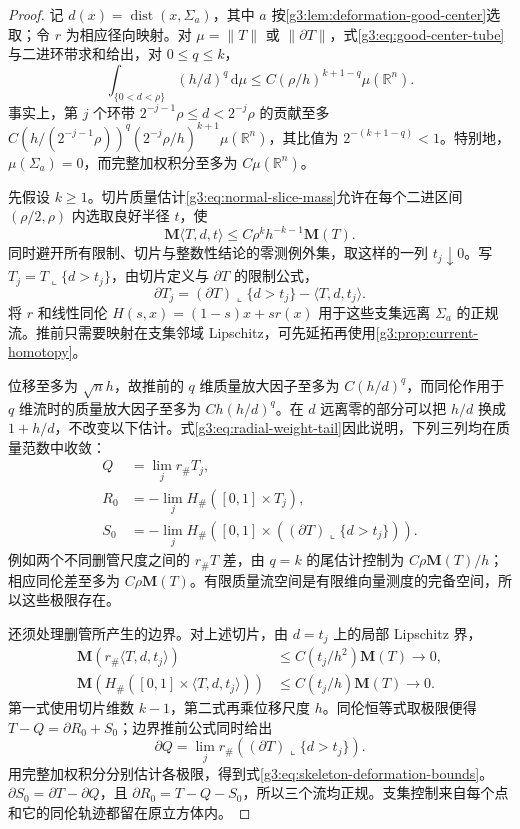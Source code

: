 \begin{proof}
	记 \(d(x)=\operatorname{dist}(x,\Sigma_a)\)，其中 \(a\) 按\cref{g3:lem:deformation-good-center}选取；令 \(r\) 为相应径向映射。对 \(\mu=\|T\|\) 或 \(\|\partial T\|\)，式\eqref{g3:eq:good-center-tube}与二进环带求和给出，对 \(0\le q\le k\)，
	\begin{equation}\label{g3:eq:radial-weight-tail}
	\int_{\{0<d<\rho\}}(h/d)^q\,\mathrm d\mu
	\le C(\rho/h)^{k+1-q}\mu(\mathbb R^n).
	\end{equation}
	事实上，第 \(j\) 个环带 \(2^{-j-1}\rho\le d<2^{-j}\rho\) 的贡献至多
	\(C(h/(2^{-j-1}\rho))^q(2^{-j}\rho/h)^{k+1}\mu(\mathbb R^n)\)，其比值为 \(2^{-(k+1-q)}<1\)。特别地，\(\mu(\Sigma_a)=0\)，而完整加权积分至多为 \(C\mu(\mathbb R^n)\)。

	先假设 \(k\ge1\)。切片质量估计\eqref{g3:eq:normal-slice-mass}允许在每个二进区间 \((\rho/2,\rho)\) 内选取良好半径 \(t\)，使
	\[
	\mathbf M\langle T,d,t\rangle
	\le C\rho^k h^{-k-1}\mathbf M(T).
	\]
	同时避开所有限制、切片与整数性结论的零测例外集，取这样的一列 \(t_j\downarrow0\)。写
	\(T_j=T\llcorner\{d>t_j\}\)，由切片定义与 \(\partial T\) 的限制公式，
	\[
	\partial T_j=(\partial T)\llcorner\{d>t_j\}-\langle T,d,t_j\rangle.
	\]
	将 \(r\) 和线性同伦
	\(H(s,x)=(1-s)x+sr(x)\) 用于这些支集远离 \(\Sigma_a\) 的正规流。推前只需要映射在支集邻域 Lipschitz，可先延拓再使用\cref{g3:prop:current-homotopy}。

	位移至多为 \(\sqrt n h\)，故推前的 \(q\) 维质量放大因子至多为 \(C(h/d)^q\)，而同伦作用于 \(q\) 维流时的质量放大因子至多为 \(Ch(h/d)^q\)。在 \(d\) 远离零的部分可以把 \(h/d\) 换成 \(1+h/d\)，不改变以下估计。式\eqref{g3:eq:radial-weight-tail}因此说明，下列三列均在质量范数中收敛：
	\[
	\begin{aligned}
	Q&=\lim_j r_\#T_j,\\
	R_0&=-\lim_j H_\#([0,1]\times T_j),\\
	S_0&=-\lim_j H_\#([0,1]\times
	((\partial T)\llcorner\{d>t_j\})).
	\end{aligned}
	\]
	例如两个不同删管尺度之间的 \(r_\#T\) 差，由 \(q=k\) 的尾估计控制为 \(C\rho\mathbf M(T)/h\)；相应同伦差至多为 \(C\rho\mathbf M(T)\)。有限质量流空间是有限维向量测度的完备空间，所以这些极限存在。

	还须处理删管所产生的边界。对上述切片，由 \(d=t_j\) 上的局部 Lipschitz 界，
	\[
	\begin{aligned}
	\mathbf M(r_\#\langle T,d,t_j\rangle)
	&\le C(t_j/h^2)\mathbf M(T)\longrightarrow0,\\
	\mathbf M(H_\#([0,1]\times\langle T,d,t_j\rangle))
	&\le C(t_j/h)\mathbf M(T)\longrightarrow0.
	\end{aligned}
	\]
	第一式使用切片维数 \(k-1\)，第二式再乘位移尺度 \(h\)。同伦恒等式取极限便得 \(T-Q=\partial R_0+S_0\)；边界推前公式同时给出
	\[
	\partial Q=\lim_j r_\#((\partial T)\llcorner\{d>t_j\}).
	\]
	用完整加权积分分别估计各极限，得到式\eqref{g3:eq:skeleton-deformation-bounds}。\(\partial S_0=\partial T-\partial Q\)，且 \(\partial R_0=T-Q-S_0\)，所以三个流均正规。支集控制来自每个点和它的同伦轨迹都留在原立方体内。


\end{proof}
